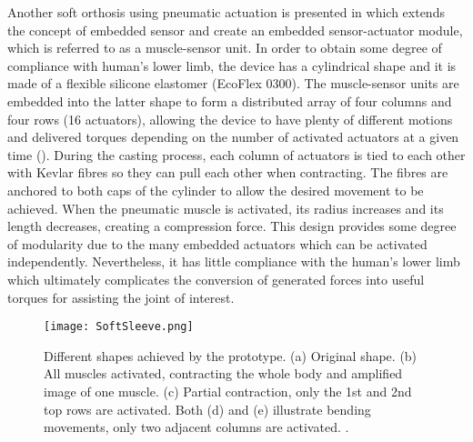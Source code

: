 Another soft orthosis using pneumatic actuation is presented in \cite{Park2012} which extends the concept of embedded sensor and create an embedded sensor-actuator module, which is referred to as a muscle-sensor unit. In order to obtain some degree of compliance with human's lower limb, the device has a cylindrical shape and it is made of a flexible silicone elastomer (EcoFlex 0300). The muscle-sensor units are embedded into the latter shape to form a distributed array of four columns and four rows (16 actuators), allowing the device to have plenty of different motions and delivered torques depending on the number of activated actuators at a given time (). During the casting process, each column of actuators is tied to each other with Kevlar fibres so they can pull each other when contracting. The fibres are anchored to both caps of the cylinder to allow the desired movement to be achieved. When the pneumatic muscle is activated, its radius increases and its length decreases, creating a compression force. This design provides some degree of modularity due to the many embedded actuators which can be activated independently. Nevertheless, it has little compliance with the human's lower limb which ultimately complicates the conversion of generated forces into useful torques for assisting the joint of interest.
\begin{figure}[hbtp!]
    \centering
    \texttt{[image: SoftSleeve.png]}
    \caption{Different shapes achieved by the prototype. (a) Original shape. (b) All muscles activated, contracting the whole body and amplified image of one muscle. (c) Partial contraction, only the 1st and 2nd top rows are activated. Both (d) and (e) illustrate bending movements, only two adjacent columns are activated. \cite{Park2012}. }
    \label{fig:soft_sleeve}
\end{figure}

